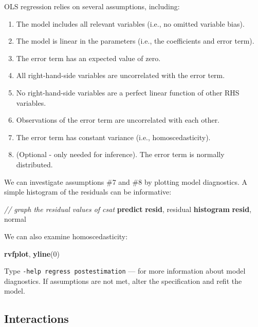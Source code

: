 \documentclass[
]{book}
\newenvironment{Shaded}{\begin{snugshade}}{\end{snugshade}}
\newcommand{\CommentTok}[1]{\textcolor[rgb]{0.56,0.35,0.01}{\textit{#1}}}
\newcommand{\FunctionTok}[1]{\textcolor[rgb]{0.00,0.00,0.00}{#1}}
\newcommand{\KeywordTok}[1]{\textcolor[rgb]{0.13,0.29,0.53}{\textbf{#1}}}
\newcommand{\NormalTok}[1]{#1}
\providecommand{\tightlist}{%
  \setlength{\itemsep}{0pt}\setlength{\parskip}{0pt}}
\begin{document}
OLS regression relies on several assumptions, including:

\begin{enumerate}
\def\labelenumi{\arabic{enumi}.}
\tightlist
\item
  The model includes all relevant variables (i.e., no omitted variable bias).
\item
  The model is linear in the parameters (i.e., the coefficients and error term).
\item
  The error term has an expected value of zero.
\item
  All right-hand-side variables are uncorrelated with the error term.
\item
  No right-hand-side variables are a perfect linear function of other RHS variables.
\item
  Observations of the error term are uncorrelated with each other.
\item
  The error term has constant variance (i.e., homoscedasticity).
\item
  (Optional - only needed for inference). The error term is normally distributed.
\end{enumerate}

We can investigate assumptions \#7 and \#8 by plotting model diagnostics. A simple histogram of the residuals can be informative:

\begin{Shaded}
\begin{Highlighting}[]
\CommentTok{// graph the residual values of csat}
\KeywordTok{predict} \KeywordTok{resid}\NormalTok{, residual}
\KeywordTok{histogram} \KeywordTok{resid}\NormalTok{, }\FunctionTok{normal} 
\end{Highlighting}
\end{Shaded}

We can also examine homoscedasticity:

\begin{Shaded}
\begin{Highlighting}[]
\KeywordTok{rvfplot}\NormalTok{, }\KeywordTok{yline}\NormalTok{(0)}
\end{Highlighting}
\end{Shaded}

Type \texttt{-help\ regress\ postestimation} --- for more information about model diagnostics. If assumptions are not met, alter the specification and refit the model.

\hypertarget{interactions}{%
\subsection{Interactions}\label{interactions}}
\end{document}
